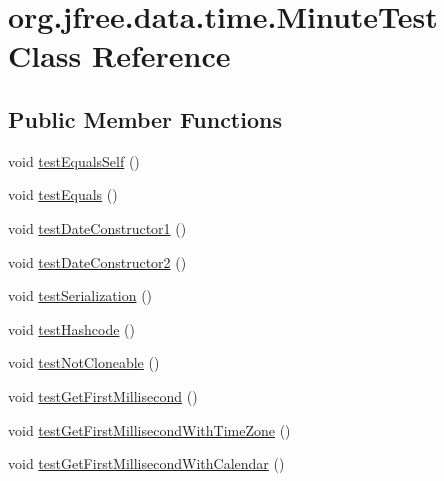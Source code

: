 \hypertarget{classorg_1_1jfree_1_1data_1_1time_1_1_minute_test}{}\section{org.\+jfree.\+data.\+time.\+Minute\+Test Class Reference}
\label{classorg_1_1jfree_1_1data_1_1time_1_1_minute_test}
\subsection*{Public Member Functions}
\begin{DoxyCompactItemize}
\item 
void \mbox{\hyperlink{classorg_1_1jfree_1_1data_1_1time_1_1_minute_test_aab3bb7558f376d83bc4acebab21cd79b}{test\+Equals\+Self}} ()
\item 
void \mbox{\hyperlink{classorg_1_1jfree_1_1data_1_1time_1_1_minute_test_a3a3ff8a0a541ef0cd9ca24889645b773}{test\+Equals}} ()
\item 
void \mbox{\hyperlink{classorg_1_1jfree_1_1data_1_1time_1_1_minute_test_a2c777d6499d06aa15ae5203a8630538b}{test\+Date\+Constructor1}} ()
\item 
void \mbox{\hyperlink{classorg_1_1jfree_1_1data_1_1time_1_1_minute_test_aeaf5792c490cc75c9d285ebcba1ddbba}{test\+Date\+Constructor2}} ()
\item 
void \mbox{\hyperlink{classorg_1_1jfree_1_1data_1_1time_1_1_minute_test_a70d88c262e4dbe2553cf1f3c6e9e61c8}{test\+Serialization}} ()
\item 
void \mbox{\hyperlink{classorg_1_1jfree_1_1data_1_1time_1_1_minute_test_a02cce98bf8c0bdb3b8f4bff3cc733ba0}{test\+Hashcode}} ()
\item 
void \mbox{\hyperlink{classorg_1_1jfree_1_1data_1_1time_1_1_minute_test_abe3cb62ee28c746a502b6ee79ca27315}{test\+Not\+Cloneable}} ()
\item 
void \mbox{\hyperlink{classorg_1_1jfree_1_1data_1_1time_1_1_minute_test_a73ad5a8fb861b265839204ffbb7afbef}{test\+Get\+First\+Millisecond}} ()
\item 
void \mbox{\hyperlink{classorg_1_1jfree_1_1data_1_1time_1_1_minute_test_a7c40948f13e59df14f8e285302e92292}{test\+Get\+First\+Millisecond\+With\+Time\+Zone}} ()
\item 
void \mbox{\hyperlink{classorg_1_1jfree_1_1data_1_1time_1_1_minute_test_af14314748a74f6531e0f0ed3adeba6fd}{test\+Get\+First\+Millisecond\+With\+Calendar}} ()
\item 

\end{DoxyCompactItemize}
